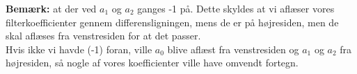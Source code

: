\documentclass[a4paper,onecolumn,oneside]{report}
\begin{document}
\textbf{Bemærk:} at der ved $a_1$ og $a_2$ ganges -1 på. Dette skyldes at vi aflæser vores filterkoefficienter gennem differensligningen, mens de er på højresiden, men de skal aflæses fra venstresiden for at det passer.\\
Hvis ikke vi havde (-1) foran, ville $a_0$ blive aflæst fra venstresiden og $a_1$ og $a_2$ fra højresiden, så nogle af vores koefficienter ville have omvendt fortegn.




\end{document}
